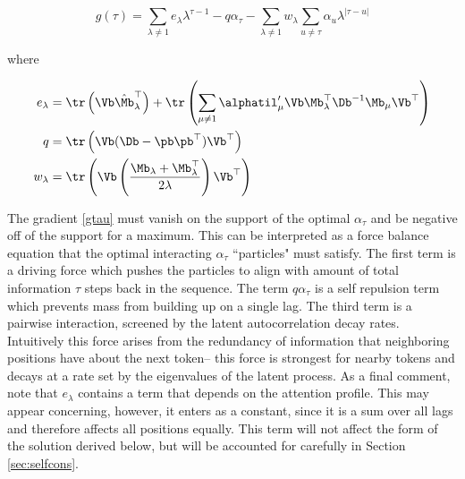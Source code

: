 \documentclass{article}
\begin{document}
\begin{equation}\label{gtau}
    g(\tau) = \sum_{\lambda \neq 1}e_\lambda \lambda^{\tau-1} - q\alpha_\tau - \sum_{\lambda\neq1}w_\lambda \sum_{u \neq \tau}\alpha_u \lambda^{|\tau - u|}
\end{equation}

where 

\begin{align}
    e_\lambda &= \tr\left( \Vb \hat{\Mb}_\lambda^\top\right) + \tr\left(\sum_{\mu \neq1} \alphatil'_\mu \Vb \Mb_\lambda^\top \Db^{-1}\Mb_\mu\Vb^\top \right) \\
    q &= \tr\left(\Vb(\Db - \pb\pb^\top)\Vb^\top\right) \\
    w_\lambda &=\tr\left(\Vb\left(\frac{\Mb_\lambda + \Mb_\lambda^\top}{2\lambda}\right)\Vb^\top\right)
\end{align}

The gradient \eqref{gtau} must vanish on the support of the optimal $\alpha_\tau$ and be negative off of the support for a maximum. This can be interpreted as a force balance equation that the optimal interacting $\alpha_\tau$ ``{particles}" must satisfy. The first term is a driving force which pushes the particles to align with amount of total information $\tau$ steps back in the sequence. The term $q\alpha_\tau$ is a self repulsion term which prevents mass from building up on a single lag. The third term is a pairwise interaction, screened by the latent autocorrelation decay rates. Intuitively this force arises from the redundancy of information that neighboring positions have about the next token-- this force is strongest for nearby tokens and decays at a rate set by the eigenvalues of the latent process. As a final comment, note that $e_\lambda$ contains a term that depends on the attention profile. This may appear concerning, however, it enters as a constant, since it is a sum over all lags and therefore affects all positions equally. This term will not affect the form of the solution derived below, but will be accounted for carefully in Section \ref{sec:selfcons}. 


\end{document}
